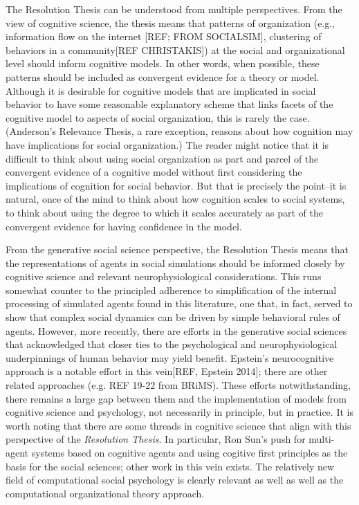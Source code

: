 \documentclass{article}
\begin{document}
The Resolution Thesis can be understood from multiple perspectives.  From the view of cognitive science, the thesis means that patterns of organization (e.g., information flow on the internet [REF; FROM SOCIALSIM], clustering of behaviors in a community[REF CHRISTAKIS]) at the social and organizational level should inform cognitive models.  In other words, when possible, these patterns should be included as convergent evidence for a theory or model.  Although it is desirable for cognitive models that are implicated in social behavior to have some reasonable explanatory scheme that links facets of the cognitive model to aspects of social organization, this is rarely the case.  (Anderson's Relevance Thesis, a rare exception, reasons about how cognition may have implications for social organization.)  The reader might notice that it is difficult to think about using social organization as part and parcel of the convergent evidence of a cognitive model without first considering the implications of cognition for social behavior.  But that is precisely the point--it is natural, once of the mind to think about how cognition scales to social systems, to think about using the degree to which it scales accurately as part of the convergent evidence for having confidence in the model. 

From the generative social science perspective, the Resolution Thesis means that the representations of agents in social simulations should be informed closely by cognitive science and relevant neurophysiological considerations.  This runs somewhat counter to the principled adherence to simplification of the internal processing of simulated agents found in this literature, one that, in fact, served to show that complex social dynamics can be driven by simple behavioral rules of agents.  However, more recently, there are efforts in the generative social sciences that acknowledged that closer ties to the psychological and neurophysiological underpinnings of human behavior may yield benefit.  Epstein's neurocognitive approach is a notable effort in this vein[REF, Epstein 2014]; there are other related approaches (e.g. REF 19-22 from BRiMS).  These efforts notwithstanding, there remains a large gap between them and the implementation of models from cognitive science and psychology, not necessarily in principle, but in practice. It is worth noting that there are some threads in cognitive science that align with this perspective of the \textit{Resolution Thesis}.  In particular, Ron Sun's push for multi-agent systems based on cognitive agents and using cogitive first principles as the basis for the social sciences\cite{sun2006}; other work in this vein exists\cite{ohlsson2010}.  The relatively new field of computational social psychology is clearly relevant as well \cite{vallacher2017} as well as the computational organizational theory approach\cite{prietula1998}.
\end{document}

